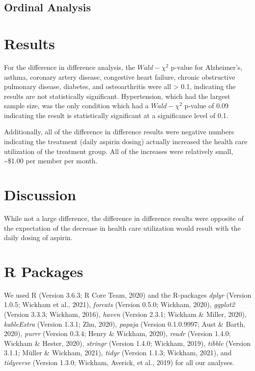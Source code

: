 \documentclass[
  english,
  man]{apa6}
\begin{document}
\hypertarget{ordinal-analysis}{%
\subsection{Ordinal Analysis}\label{ordinal-analysis}}

\hypertarget{results}{%
\section{Results}\label{results}}

For the difference in difference analysis, the \(Wald-\chi^2\) p-value for Alzheimer's, asthma, coronary artery disease, congestive heart failure, chronic obstructive pulmonary disease, diabetes, and osteoarthritis were all \textgreater{} 0.1, indicating the results are not statistically significant. Hypertension, which had the largest sample size, was the only condition which had a \(Wald-\chi^2\) p-value of 0.09 indicating the result is statistically significant at a significance level of 0.1.

Additionally, all of the difference in difference results were negative numbers indicating the treatment (daily aspirin dosing) actually increased the health care utilization of the treatment group. All of the increases were relatively small, \textasciitilde\$1.00 per member per month.

\hypertarget{discussion}{%
\section{Discussion}\label{discussion}}

While not a large difference, the difference in difference results were opposite of the expectation of the decrease in health care utilization would result with the daily dosing of aspirin.

\newpage

\hypertarget{r-packages}{%
\section{R Packages}\label{r-packages}}

We used R (Version 3.6.3; R Core Team, 2020) and the R-packages \emph{dplyr} (Version 1.0.5; Wickham et al., 2021), \emph{forcats} (Version 0.5.0; Wickham, 2020), \emph{ggplot2} (Version 3.3.3; Wickham, 2016), \emph{haven} (Version 2.3.1; Wickham \& Miller, 2020), \emph{kableExtra} (Version 1.3.1; Zhu, 2020), \emph{papaja} (Version 0.1.0.9997; Aust \& Barth, 2020), \emph{purrr} (Version 0.3.4; Henry \& Wickham, 2020), \emph{readr} (Version 1.4.0; Wickham \& Hester, 2020), \emph{stringr} (Version 1.4.0; Wickham, 2019), \emph{tibble} (Version 3.1.1; Müller \& Wickham, 2021), \emph{tidyr} (Version 1.1.3; Wickham, 2021), and \emph{tidyverse} (Version 1.3.0; Wickham, Averick, et al., 2019) for all our analyses.
\end{document}
